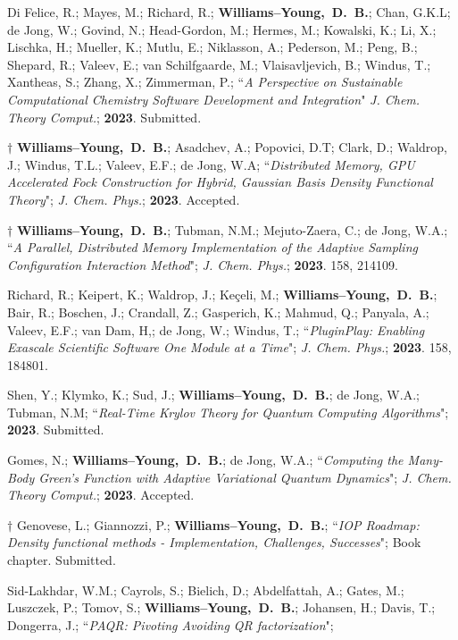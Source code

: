 \documentclass[10pt]{res} %
\newcommand*\me[0]{{\bf Williams--Young,~D.~B.}}
\begin{document}
\begin{resume}
\begin{etaremune}
  \item Di Felice, R.; Mayes, M.; Richard, R.; \me; Chan, G.K.L; de Jong, W.; 
        Govind, N.; Head-Gordon, M.; Hermes, M.; Kowalski, K.; Li, X.; Lischka, H.; Mueller, K.; 
	Mutlu, E.; Niklasson, A.; Pederson, M.; Peng, B.; Shepard, R.; Valeev, E.; van Schilfgaarde, M.; 
	Vlaisavljevich, B.; Windus, T.; Xantheas, S.; Zhang, X.; Zimmerman, P.;
	``\emph{A Perspective on Sustainable Computational Chemistry Software Development and Integration}"
	\emph{J. Chem. Theory Comput.}; \textbf{2023}. Submitted.
  \item $\dagger$ \me; Asadchev, A.; Popovici, D.T; Clark, D.; Waldrop, J.; Windus, T.L.;
        Valeev, E.F.; de Jong, W.A;
        ``\emph{Distributed Memory, GPU Accelerated Fock Construction for Hybrid, Gaussian 
                Basis Density Functional Theory}";
        \emph{J. Chem. Phys.}; \textbf{2023}. Accepted.
  \item $\dagger$ \me; Tubman, N.M.; Mejuto-Zaera, C.; de Jong, W.A.;
        ``\emph{A Parallel, Distributed Memory Implementation of the Adaptive 
                Sampling Configuration Interaction Method}";
        \emph{J. Chem. Phys.}; \textbf{2023}. 158, 214109. 
  \item Richard, R.; Keipert, K.; Waldrop, J.; Keçeli, M.; \me; Bair, R.; Boschen, J.; 
        Crandall, Z.; Gasperich, K.; Mahmud, Q.; Panyala, A.; Valeev, E.F.; van Dam, H,; 
        de Jong, W.; Windus, T.;
       ``\emph{PluginPlay: Enabling Exascale Scientific Software One Module at a Time}";
        \emph{J. Chem. Phys.}; \textbf{2023}. 158, 184801. 
  \item Shen, Y.; Klymko, K.; Sud, J.; \me; de Jong, W.A.; Tubman, N.M;
    ``\emph{Real-Time Krylov Theory for Quantum Computing Algorithms}";
    \textbf{2023}. Submitted.
  \item Gomes, N.; \me;  de Jong, W.A.;
    ``\emph{Computing the Many-Body Green's Function with Adaptive Variational 
            Quantum Dynamics}";
    \emph{J. Chem. Theory Comput.}; \textbf{2023}. Accepted.
  \item $\dagger$ Genovese, L.; Giannozzi, P.; \me;
        ``\emph{IOP Roadmap: Density functional methods - Implementation, 
                Challenges, Successes}";
        Book chapter. Submitted.
  \item Sid-Lakhdar, W.M.; Cayrols, S.; Bielich, D.; Abdelfattah, A.; Gates, M.; Luszczek, P.; Tomov, S.; 
        \me; Johansen, H.; Davis, T.; Dongerra, J.; 
        ``\emph{PAQR: Pivoting Avoiding QR factorization}"; 

\end{etaremune}
\end{resume}
\end{document}
